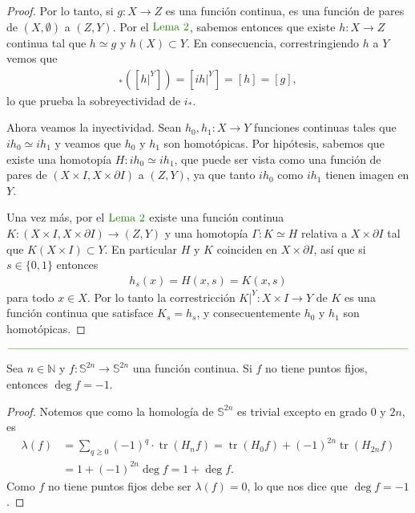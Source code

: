\documentclass[11pt]{article}
\newcommand{\N}{\mathbb{N}}
\newcommand{\Ss}{\mathbb{S}}
\newcommand{\tr}{\operatorname{tr}}
\newcommand{\paint}[1]{\color{color}{#1}}
\newenvironment{lemma}[2][Lema]{\begin{trivlist}
\item[\hskip \labelsep \paint{{\bfseries #1}}\hskip \labelsep {\bfseries #2.}]}{\end{trivlist}}
\begin{document}
\begin{proof}
Por lo tanto, si $g : X \to Z$ es una función continua, es una función de pares de $(X, \emptyset)$ a $(Z,Y)$. Por el $\paint{\text{Lema $2$}}$, sabemos entonces que existe $h : X \to Z$ continua tal que $h \simeq g$ y $h(X) \subset Y$. En consecuencia, correstringiendo $h$ a $Y$ vemos que
\begin{align*}
[i]_*\left([h|^Y]\right) = [ih|^Y] = [h] =  [g],
\end{align*}
lo que prueba la sobreyectividad de $i_*$.

Ahora veamos la inyectividad. Sean $h_0,h_1 : X \to Y$ funciones continuas tales que $ih_0 \simeq ih_1$ y veamos que $h_0$ y $h_1$ son homotópicas. Por hipótesis, sabemos que existe una homotopía $H : ih_0 \simeq ih_1$, que puede ser vista como una función de pares de $(X \times I, X \times \partial I)$ a $(Z,Y)$, ya que tanto $ih_0$ como $ih_1$ tienen imagen en $Y$. 

Una vez más, por el $\paint{\text{Lema $2$}}$ existe una función continua $K : (X \times I, X \times \partial I) \to (Z,Y)$ y una homotopía $\Gamma : K \simeq H$ relativa a $X \times \partial I$ tal que $K(X \times I) \subset Y$. En particular $H$ y $K$ coinciden en $X \times \partial I$, así que si $s \in \{0,1\}$ entonces
\begin{align*}
h_s(x) = H(x,s) = K(x,s)
\end{align*}
para todo $x \in X$. Por lo tanto la correstricción $K|^Y : X \times I \to Y$ de $K$ es una función continua que satisface $K_s = h_s$, y consecuentemente $h_0$ y $h_1$ son homotópicas.
\end{proof}

\begin{center}
$\paint{
\rule{400pt}{0.5pt}
}$
\vspace{10pt}
\end{center}

\begin{lemma}{3} Sea $n \in \N$ y $f : \Ss^{2n} \to \Ss^{2n}$ una funci\'on continua. Si $f$ no tiene puntos fijos, entonces $\deg f = -1$.
\end{lemma}
\begin{proof} Notemos que como la homolog\'ia de $\Ss^{2n}$ es trivial excepto en grado $0$ y $2n$, es
\begin{align*}
\lambda(f) &= \sum_{q \geq 0}(-1)^q \cdot \tr(H_nf) = \tr(H_0f) + (-1)^{2n}\tr(H_{2n}f)\\
& = 1 + (-1)^{2n}\deg f = 1 + \deg f.
\end{align*}
Como $f$ no tiene puntos fijos debe ser $\lambda(f) = 0$, lo que nos dice que $\deg f = -1$. 
\end{proof}
\end{document}
